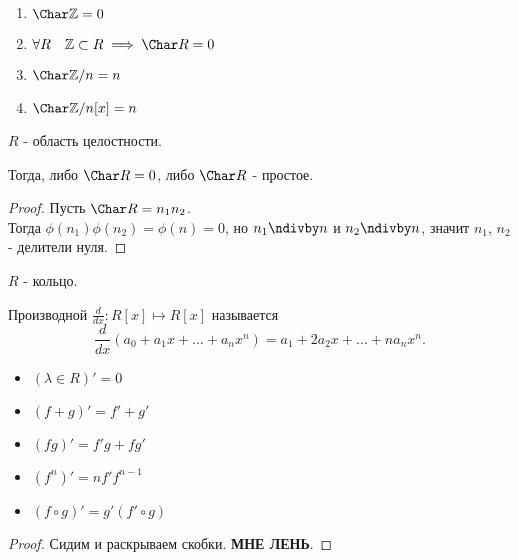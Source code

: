 \begin{example} \thmslashn

    \begin{enumerate}
        \item $\Char  \mathbb{Z} = 0$ 
        \item $\forall{R}\quad \mathbb{Z} \subset R \implies \Char R = 0$ 
        \item $\Char \mathbb{Z}/n = n$ 
        \item $\Char \mathbb{Z}/n[x] = n$
    \end{enumerate}
\end{example}
\begin{theorem} \thmslashn

    $R$ - область целостности.

    Тогда, либо $\Char R = 0$, либо $\Char R$ - простое.
    \begin{proof}
        Пусть $\Char R = n_1n_2$.\\

        Тогда $\phi(n_1)\phi(n_2) = \phi(n) = 0 $, но $n_1\ndivby n$ и $n_2 \ndivby n$, значит $n_1$, $n_2$ - делители нуля.
    \end{proof}
\end{theorem}
\begin{definition} \thmslashn 
    
    $R$ - кольцо.

    Производной $ \frac{d}{dx} : R[x] \mapsto R[x] $ называется
    \[ \frac{d}{dx}(a_0+a_1x + \ldots + a_{n}x^{n}) = a_1 + 2a_2x + \ldots + na_nx^{n} .\] 
\end{definition}
\begin{properties} \thmslashn

    \begin{itemize}
        \item $(\lambda\in R)' = 0$
        \item $(f+g)' = f'+g'$ 
        \item $(fg)' = f'g+fg'$
        \item  $(f^{n})' = nf'f^{n-1}$ 
        \item $(f\circ g)' = g'(f' \circ g)$
    \end{itemize}
    \begin{proof}
        Сидим и раскрываем скобки. \textbf{МНЕ ЛЕНЬ}.
    \end{proof}
\end{properties}
